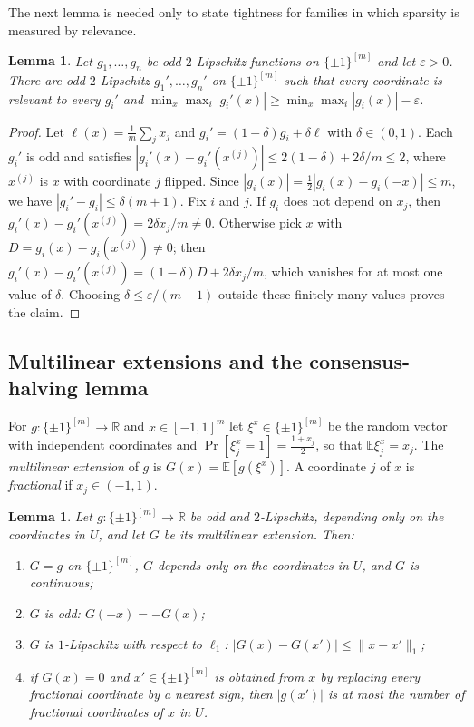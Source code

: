 \documentclass[11pt,letterpaper]{article}
\newtheorem{lemma}[theorem]{Lemma}
\theoremstyle{definition}
\newcommand{\R}{\mathbb{R}}
\newcommand{\E}{\mathbb{E}}
\newcommand{\cube}[1]{\{\pm1\}^{#1}}
\begin{document}
The next lemma is needed only to state tightness for families in which sparsity is measured by
relevance.

\begin{lemma}\label{lem:allrelevant}
Let $g_1,\dots,g_n$ be odd $2$-Lipschitz functions on $\cube{[m]}$ and let $\varepsilon>0$. There
are odd $2$-Lipschitz $g_1',\dots,g_n'$ on $\cube{[m]}$ such that every coordinate is relevant to
every $g_i'$ and $\min_x\max_i|g_i'(x)|\ge\min_x\max_i|g_i(x)|-\varepsilon$.
\end{lemma}

\begin{proof}
Let $\ell(x)=\frac1m\sum_jx_j$ and $g_i'=(1-\delta)g_i+\delta\ell$ with $\delta\in(0,1)$. Each
$g_i'$ is odd and satisfies $|g_i'(x)-g_i'(x^{(j)})|\le2(1-\delta)+2\delta/m\le2$, where
$x^{(j)}$ is $x$ with coordinate $j$ flipped. Since $|g_i(x)|=\frac12|g_i(x)-g_i(-x)|\le m$, we
have $|g_i'-g_i|\le\delta(m+1)$. Fix $i$ and $j$. If $g_i$ does not depend on $x_j$, then
$g_i'(x)-g_i'(x^{(j)})=2\delta x_j/m\ne0$. Otherwise pick $x$ with $D=g_i(x)-g_i(x^{(j)})\ne0$; then
$g_i'(x)-g_i'(x^{(j)})=(1-\delta)D+2\delta x_j/m$, which vanishes for at most one value of
$\delta$. Choosing $\delta\le\varepsilon/(m+1)$ outside these finitely many values proves the
claim.
\end{proof}

\subsection{Multilinear extensions and the consensus-halving lemma}

For $g\colon\cube{[m]}\to\R$ and $x\in[-1,1]^m$ let $\xi^x\in\cube{[m]}$ be the random vector with
independent coordinates and $\Pr[\xi^x_j=1]=\frac{1+x_j}2$, so that $\E\xi^x_j=x_j$. The
\emph{multilinear extension} of $g$ is $G(x)=\E[g(\xi^x)]$. A coordinate $j$ of $x$ is
\emph{fractional} if $x_j\in(-1,1)$.

\begin{lemma}\label{lem:multilinear}
Let $g\colon\cube{[m]}\to\R$ be odd and $2$-Lipschitz, depending only on the coordinates in $U$,
and let $G$ be its multilinear extension. Then:
\begin{enumerate}[label=(\alph*),itemsep=0pt]
\item $G=g$ on $\cube{[m]}$, $G$ depends only on the coordinates in $U$, and $G$ is continuous;
\item $G$ is odd: $G(-x)=-G(x)$;
\item $G$ is $1$-Lipschitz with respect to $\ell_1$: $|G(x)-G(x')|\le\|x-x'\|_1$;
\item if $G(x)=0$ and $x'\in\cube{[m]}$ is obtained from $x$ by replacing every fractional
coordinate by a nearest sign, then $|g(x')|$ is at most the number of fractional coordinates of
$x$ in $U$.
\end{enumerate}
\end{lemma}
\end{document}
